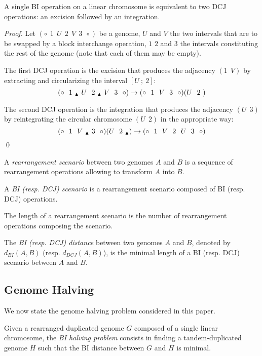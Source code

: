\documentclass{llncs}
\newcommand{\breakpoint}{ \textsubscript{$\textcolor{black}{\blacktriangle}$} }
\begin{document}
\begin{property}
\label{1BIto2DCJ}
A single BI operation on a linear chromosome is equivalent to two DCJ operations: an excision followed by an integration.
\end{property}


\begin{proof}
Let $(\circ~~1~~U~~2~~V~~3~~\circ)$ be a genome, $U$ and $V$ the two intervals 
that are to be swapped by a block interchange operation, $1$ $2$ and $3$ the 
intervals constituting the rest of the genome (note that each of them may be 
empty). 

The first DCJ operation is the excision that produces the adjacency
$(1~~V)$ by extracting and circularizing the interval $[U~;~2]$: 
$$(\circ~~1~\breakpoint~U~~2~\breakpoint~V~~3~~\circ) \rightarrow
(\circ~~1~~V~~3~~\circ)(U~~2~)$$

The second DCJ operation is the integration that produces the adjacency
$(U~~3)$ by reintegrating the circular chromosome $(U~~2)$ in the
appropriate way:
$$(\circ~~1~~V~\breakpoint~3~~\circ)(U~~2~\breakpoint) \rightarrow (\circ~~1~~V~~2~~U~~3~~\circ)$$\qed
\end{proof}

A \emph{rearrangement scenario} between two genomes $A$ and $B$ is a sequence of rearrangement operations allowing to transform $A$ into $B$.

\begin{definition}
A \emph{BI (resp. DCJ) scenario} is a rearrangement scenario composed of BI (resp. DCJ) operations.
\end{definition}


The length of a rearrangement scenario is the number of rearrangement operations composing the scenario. 
\begin{definition}
The \emph{BI (resp. DCJ) distance} between two genomes $A$ and $B$, denoted by $d_{BI}(A,B)$ (resp. $d_{DCJ}(A,B)$), is the minimal length of a  BI (resp. DCJ) scenario between $A$ and $B$.
\end{definition}


\subsection*{Genome Halving}
\label{sec:halving}


We now state the genome halving problem considered in this paper.

\begin{definition}
Given a rearranged duplicated genome $G$ composed of a single linear chromosome, the \emph{BI halving problem} consists in finding a tandem-duplicated genome $H$ such that the BI distance between $G$ and $H$ is minimal.
\end{definition}
\end{document}
